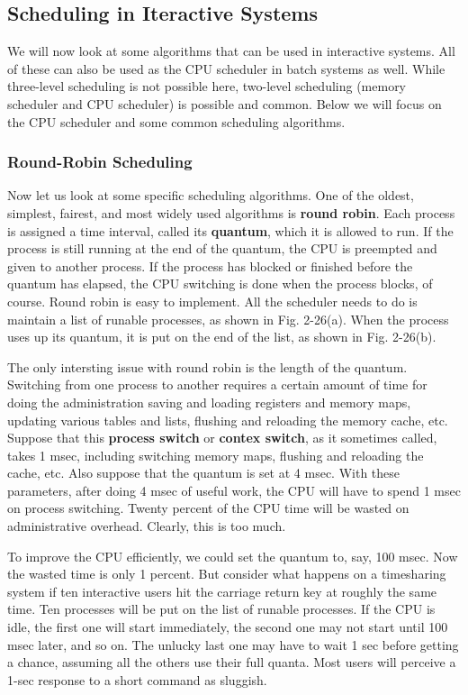 \documentclass{book}
\newcommand {\kw}  [1] {\textbf{#1}}
\begin{document}
\subsection{Scheduling in Iteractive Systems}
We will now look at some algorithms that can be used in interactive systems.
All of these can also be used as the CPU scheduler in batch systems as well.
While three-level scheduling is not possible here, two-level scheduling (memory scheduler and CPU scheduler) is possible and common.
Below we will focus on the CPU scheduler and some common scheduling algorithms.

\subsubsection*{Round-Robin Scheduling}
Now let us look at some specific scheduling algorithms.
One of the oldest, simplest, fairest, and most widely used algorithms is \kw{round robin}.
Each process is assigned a time interval, called its \kw{quantum}, which it is allowed to run.
If the process is still running at the end of the quantum, the CPU is preempted and given to another process.
If the process has blocked or finished before the quantum has elapsed,
the CPU switching is done when the process blocks, of course.
Round robin is easy to implement.
All the scheduler needs to do is maintain a list of runable processes, as shown in Fig. 2-26(a).
When the process uses up its quantum, it is put on the end of the list, as shown in Fig. 2-26(b).

The only intersting issue with round robin is the length of the quantum.
Switching from one process to another requires a certain amount of time 
for doing the administration saving and loading registers and memory maps,
updating various tables and lists, flushing and reloading the memory cache, etc.
Suppose that this \kw{process switch} or \kw{contex switch}, as it sometimes called, takes 1 msec, 
including switching memory maps, flushing and reloading the cache, etc.
Also suppose that the quantum is set at 4 msec.
With these parameters, after doing 4 msec of useful work,
the CPU will have to spend 1 msec on process switching.
Twenty percent of the CPU time will be wasted on administrative overhead.
Clearly, this is too much.

To improve the CPU efficiently, we could set the quantum to, say, 100 msec.
Now the wasted time is only 1 percent.
But consider what happens on a timesharing system if ten interactive users hit the carriage return key at roughly the same time.
Ten processes will be put on the list of runable processes.
If the CPU is idle, the first one will start immediately, the second one may not start until 100 msec later, and so on.
The unlucky last one may have to wait 1 sec before getting a chance, assuming all the others use their full quanta.
Most users will perceive a 1-sec response to a short command as sluggish.
\end{document}
